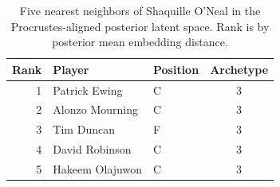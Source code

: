 \begin{table}[htbp]
  \centering\small
  \begin{tabular}{rllc}
    \toprule
    Rank & Player & Position & Archetype \\
    \midrule
    1 & Patrick Ewing & C & 3 \\
    2 & Alonzo Mourning & C & 3 \\
    3 & Tim Duncan & F & 3 \\
    4 & David Robinson & C & 3 \\
    5 & Hakeem Olajuwon & C & 3 \\
    \bottomrule
  \end{tabular}
  \caption{Five nearest neighbors of Shaquille O'Neal in the Procrustes-aligned posterior latent space. Rank is by posterior mean embedding distance.}
  \label{tab:Shaquille_O_Neal_neighbors}
\end{table}

